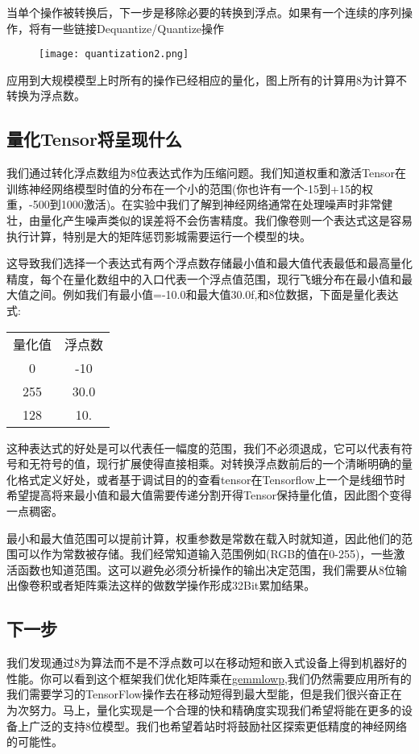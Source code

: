 当单个操作被转换后，下一步是移除必要的转换到浮点。如果有一个连续的序列操作，将有一些链接Dequantize/Quantize操作

\begin{center}
\begin{figure}[H]
\texttt{[image: quantization2.png]}
\end{figure}
\end{center}
应用到大规模模型上时所有的操作已经相应的量化，图上所有的计算用8为计算不转换为浮点数。
\subsection{量化Tensor将呈现什么}
我们通过转化浮点数组为8位表达式作为压缩问题。我们知道权重和激活Tensor在训练神经网络模型时值的分布在一个小的范围(你也许有一个-15到+15的权重，-500到1000激活)。在实验中我们了解到神经网络通常在处理噪声时非常健壮，由量化产生噪声类似的误差将不会伤害精度。我们像卷则一个表达式这是容易执行计算，特别是大的矩阵惩罚影城需要运行一个模型的块。

这导致我们选择一个表达式有两个浮点数存储最小值和最大值代表最低和最高量化精度，每个在量化数组中的入口代表一个浮点值范围，现行飞蛾分布在最小值和最大值之间。例如我们有最小值=-10.0和最大值30.0f,和8位数据，下面是量化表达式:\newline
\begin{tabular}{|c|c|}
量化值&浮点数\\
0&-10\\
255&30.0\\
128&10.
\end{tabular}
\newline
这种表达式的好处是可以代表任一幅度的范围，我们不必须退成，它可以代表有符号和无符号的值，现行扩展使得直接相乘。对转换浮点数前后的一个清晰明确的量化格式定义好处，或者基于调试目的的查看tensor在Tensorflow上一个是线细节时希望提高将来最小值和最大值需要传递分割开得Tensor保持量化值，因此图个变得一点稠密。

最小和最大值范围可以提前计算，权重参数是常数在载入时就知道，因此他们的范围可以作为常数被存储。我们经常知道输入范围例如(RGB的值在0-255)，一些激活函数也知道范围。这可以避免必须分析操作的输出决定范围，我们需要从8位输出像卷积或者矩阵乘法这样的做数学操作形成32Bit累加结果。
\subsection{下一步}
我们发现通过8为算法而不是不浮点数可以在移动短和嵌入式设备上得到机器好的性能。你可以看到这个框架我们优化矩阵乘在\href{https://github.com/google/gemmlowp}{gemmlowp},我们仍然需要应用所有的我们需要学习的TensorFlow操作去在移动短得到最大型能，但是我们很兴奋正在为次努力。马上，量化实现是一个合理的快和精确度实现我们希望将能在更多的设备上广泛的支持8位模型。我们也希望着站时将鼓励社区探索更低精度的神经网络的可能性。
